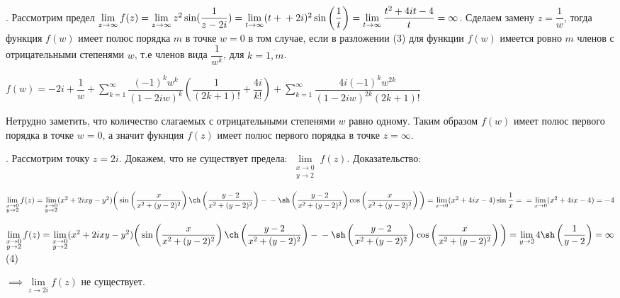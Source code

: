 \documentclass[a4paper, 12pt]{article}
\begin{document}
	. Рассмотрим предел $\lim\limits_{z \rightarrow \infty} f(z) = \lim\limits_{z \rightarrow \infty} z^2 \sin(\dfrac{1}{z-2i}) = \lim\limits_{t \rightarrow \infty} (t+ \newline + 2i)^2 \sin \left( \dfrac{1}{t} \right) = \lim\limits_{t \rightarrow \infty} \dfrac{t^2 + 4it - 4}{t} = \infty  $. 
	\quad Сделаем замену $z=\dfrac{1}{w}$, тогда функция $f(w)$ имеет полюс порядка $m$ в точке $w = 0$ в том случае, если в разложении (3) для функции $f(w)$ имеется ровно $m$ членов с отрицательными степенями $w$, т.е членов вида $\dfrac{1}{w^k}$, для $k = \overline{1,m}$.
	
	
	$f(w) = -2i + \dfrac{1}{w} + \displaystyle\sum\limits_{k=1}^{\infty} \dfrac{(-1)^k w^k}{(1-2iw)^k} \left( \dfrac{1}{(2k+1)!} + \dfrac{4i}{k!} \right) + \displaystyle\sum\limits_{k=1}^{\infty} \dfrac{4i (-1)^k w^{2k} }{(1-2iw)^{2k} (2k+1)! }$ 

	
	\quad Нетрудно заметить, что количество слагаемых с отрицательными степенями $w$ равно одному. Таким образом $f(w)$ имеет полюс первого порядка в точке $w=0$, а значит фукнция $f(z)$ имеет полюс первого порядка в точке $z = \infty$. 
	
	. Рассмотрим точку $z = 2i$. Докажем, что не существует предела: $\lim\limits_{\substack{x \to 0 \\ y \to 2}} f(z)$. Доказательство:
	
	\begin{center}
		$\lim\limits_{\substack{x \to 0 \\ y \to 2}} f(z) = \lim\limits_{\substack{x \to 0 \\ y \to 2}} (x^2 + 2ixy - y^2) \bigg( \sin \left( \dfrac{x}{x^2+(y-2)^2} \right) \ch\left( \dfrac{y-2}{x^2 + (y-2)^2} \right) - \newline - \sh \left( \dfrac{y-2}{x^2 + (y-2)^2} \right) \cos\left( \dfrac{x}{x^2 + (y-2)^2} \right)\bigg) = \lim\limits_{x \to 0} (x^2 + 4ix - 4) \sin \dfrac{1}{x} =  \newline = \lim\limits_{x \to 0} (x^2 + 4ix - 4) = -4$
		
		$\lim\limits_{\substack{x \to 0 \\ y \to 2}} f(z) = \lim\limits_{\substack{x \to 0 \\ y \to 2}} (x^2 + 2ixy - y^2) \bigg( \sin \left( \dfrac{x}{x^2+(y-2)^2} \right) \ch\left( \dfrac{y-2}{x^2 + (y-2)^2} \right) - \newline - \sh \left( \dfrac{y-2}{x^2 + (y-2)^2} \right) \cos\left( \dfrac{x}{x^2 + (y-2)^2} \right)\bigg) = \lim\limits_{y \to 2} 4 \sh\left( \dfrac{1}{y-2} \right) =  \infty $ (4)
		
		$\implies \lim\limits_{z \to 2i} f(z)$ не существует.
		
	\end{center}
	
\end{document}

